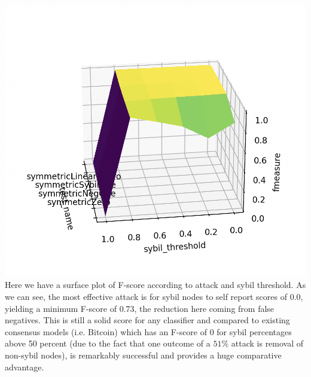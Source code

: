 \documentclass{article}
\begin{document}
\includegraphics[width=\textwidth, height=\textwidth]{f-score-surface-plot}
Here we have a surface plot of F-score according to attack and sybil threshold. As we can see, the most effective attack is for sybil nodes to self report scores of 0.0, yielding a minimum F-score of 0.73, the reduction here coming from false negatives. This is still a solid score for any classifier and compared to existing consensus models (i.e. Bitcoin) which has an F-score of 0 for sybil percentages above 50 percent (due to the fact that one outcome of a $51\%$ attack is removal of non-sybil nodes), is remarkably successful and provides a huge comparative advantage.
\end{document}
